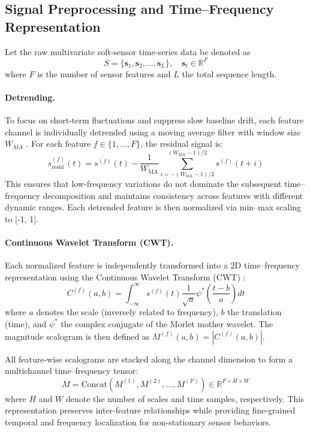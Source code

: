 \documentclass{article}
\begin{document}
\subsection{Signal Preprocessing and Time–Frequency Representation}

Let the raw multivariate soft-sensor time-series data be denoted as
\[
 S = \{ \mathbf{s}_1, \mathbf{s}_2, \dots, \mathbf{s}_L \}, \quad \mathbf{s}_t \in \mathbb{R}^F \]
where $F$ is the number of sensor features and $L$ the total sequence length.

\paragraph{Detrending.}\label{sec:detrending}

To focus on short-term fluctuations and suppress slow baseline drift, each feature channel is individually detrended using a moving average filter with window size $W_{MA}$ \citep{mitov_1998}.
For each feature $f \in \{1, \dots, F\}$, the residual signal is:
\[
 s^{(f)}_{\text{resid}}(t) = s^{(f)}(t) - \frac{1}{W_{\text{MA}}} \sum_{i=-(W_{\text{MA}}-1)/2}^{(W_{\text{MA}}-1)/2} s^{(f)}(t+i) \]
This ensures that low-frequency variations do not dominate the subsequent time–frequency decomposition and maintains consistency across features with different dynamic ranges.
Each detrended feature is then normalized via min–max scaling to [-1, 1].

\paragraph{Continuous Wavelet Transform (CWT).}

Each normalized feature is independently transformed into a 2D time–frequency representation using the Continuous Wavelet Transform (CWT) \citep{torrence_compo_1998}:
\[
 C^{(f)}(a, b) = \int_{-\infty}^{\infty} s^{(f)}(t) \frac{1}{\sqrt{a}} \psi^* \left( \frac{t - b}{a} \right) dt \]
where $a$ denotes the scale (inversely related to frequency), $b$ the translation (time), and $\psi^*$ the complex conjugate of the Morlet mother wavelet.
The magnitude scalogram is then defined as $M^{(f)}(a, b) = |C^{(f)}(a, b)|$.

All feature-wise scalograms are stacked along the channel dimension to form a multichannel time–frequency tensor:
\[
 M = \text{Concat}(M^{(1)}, M^{(2)}, \dots, M^{(F)}) \in \mathbb{R}^{F \times H \times W} \]
where $H$ and $W$ denote the number of scales and time samples, respectively.
This representation preserves inter-feature relationships while providing fine-grained temporal and frequency localization for non-stationary sensor behaviors.
\end{document}

